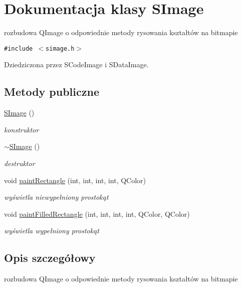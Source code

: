 \hypertarget{classSImage}{
\section{Dokumentacja klasy SImage}
\label{classSImage}
}
rozbudowa QImage o odpowiednie metody rysowania kształtów na bitmapie  


{\tt \#include $<$simage.h$>$}

Dziedziczona przez SCodeImage i SDataImage.

\subsection*{Metody publiczne}
\begin{CompactItemize}
\item 
\hyperlink{classSImage_76e408c8c9d80017ab4bcdcb4788de15}{SImage} ()
\begin{CompactList}\small\item\em konstruktor \item\end{CompactList}\item 
\hyperlink{classSImage_615b1cbc644a5d8b88fd6ec1efa8c732}{$\sim$SImage} ()
\begin{CompactList}\small\item\em destruktor \item\end{CompactList}\item 
void \hyperlink{classSImage_d5707899d17b97884f85d3ea42bd548d}{paintRectangle} (int, int, int, int, QColor)
\begin{CompactList}\small\item\em wyświetla niewypełniony prostokąt \item\end{CompactList}\item 
void \hyperlink{classSImage_dc89f8b2607722f6fbf52f481103bf71}{paintFilledRectangle} (int, int, int, int, QColor, QColor)
\begin{CompactList}\small\item\em wyświetla wypełniony prostokąt \item\end{CompactList}\end{CompactItemize}


\subsection{Opis szczegółowy}
rozbudowa QImage o odpowiednie metody rysowania kształtów na bitmapie 

